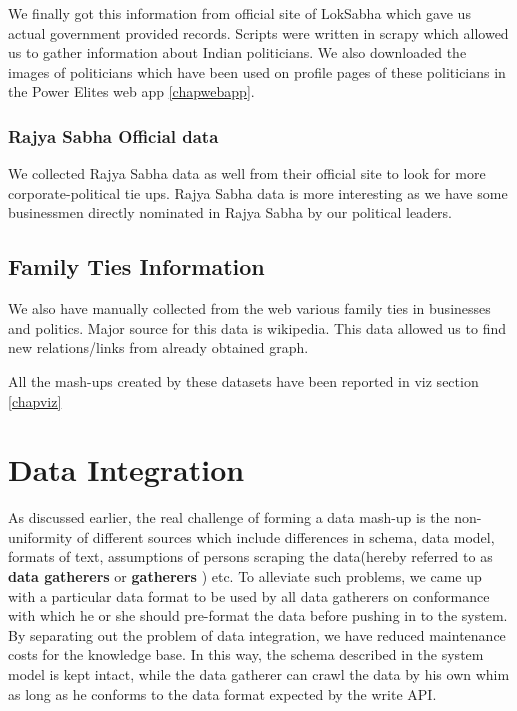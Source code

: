 We finally got this information from official site of LokSabha which gave us actual government provided records. Scripts were written in scrapy which allowed us to gather information about Indian politicians. We also downloaded the images of politicians which have been used on profile pages of these politicians in the Power Elites web app \ref{chapwebapp}.

\subsubsection{Rajya Sabha Official data}

We collected Rajya Sabha data as well from their official site to look for more corporate-political tie ups. Rajya Sabha data is more interesting as we have some businessmen directly nominated in Rajya Sabha by our political leaders.  

\subsection{Family Ties Information}

We also have manually collected from the web various family ties in businesses and politics. Major source for this data is wikipedia. This data allowed us to find new relations/links from already obtained graph.\cite{indianbfamilies} \cite{indianpfamilies}


All the mash-ups created by these datasets have been reported in viz section \ref{chapviz}

\section{Data Integration}
\label{dataint}

As discussed earlier, the real challenge of forming a data mash-up is the non-uniformity of different sources which include differences in schema, data model, formats of text, assumptions of persons scraping the data(hereby referred to as \textbf{ data gatherers } or \textbf{ gatherers }) etc. To alleviate such problems, we came up with a particular data format to be used by all data gatherers on conformance with which he or she should pre-format the data before pushing in to the system. By separating out the problem of data integration, we have reduced maintenance costs for the knowledge base. In this way, the schema described in the system model is kept intact, while the data gatherer can crawl the data by his own whim as long as he conforms to the data format expected by the write API.

